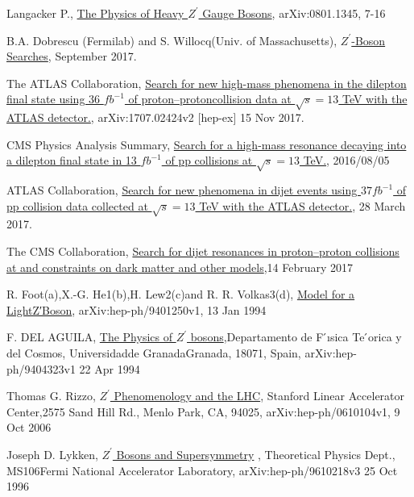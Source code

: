 \documentclass[12pt,a4paper]{article}		%
\begin{document}
\newpage
\begin{thebibliography}{}
	 Langacker P., \href{https://arxiv.org/abs/0801.1345v3}{The Physics of Heavy $Z^\prime$ Gauge Bosons}, arXiv:0801.1345, 7-16
	
	  B.A. Dobrescu (Fermilab) and S. Willocq(Univ. of Massachusetts), \href{http://pdg.lbl.gov/2017/reviews/rpp2017-rev-zprime-searches.pdf}{$Z^\prime$-Boson Searches}, September 2017.
	
	 The ATLAS Collaboration, \href{https://arxiv.org/pdf/1707.02424.pdf}{Search for new high-mass phenomena in the dilepton final state using 36 $fb^{−1}$ of proton–protoncollision data at $\sqrt{s}=13$ TeV with the ATLAS detector.}, arXiv:1707.02424v2  [hep-ex]  15 Nov 2017.
	
	 CMS Physics Analysis Summary, \href{http://inspirehep.net/record/1479666/files/EXO-16-031-pas.pdf?version=1}{Search for a high-mass resonance decaying into a dilepton final state in 13 $fb^{−1}$ of pp collisions at $\sqrt{s}=13$ TeV.}, 2016/08/05
	  
	 ATLAS Collaboration, \href{https://journals.aps.org/prd/pdf/10.1103/PhysRevD.96.052004 }{Search for new phenomena in dijet events using $37fb^{-1}$ of pp collision data collected at $\sqrt{s}=13$ TeV with the ATLAS detector.}, 28 March 2017.  
	
	 The CMS Collaboration, \href{https://www.sciencedirect.com/science/article/pii/S0370269317301028?via%3Dihub}{Search for dijet resonances in proton–proton collisions at and constraints on dark matter and other models},14 February 2017 
		
	 R. Foot(a),X.-G. He1(b),H. Lew2(c)and R. R. Volkas3(d), \href{https://arxiv.org/pdf/hep-ph/9401250.pdf}{Model for a LightZ′Boson}, arXiv:hep-ph/9401250v1, 13 Jan 1994	
	
	 F. DEL AGUILA,  \href{https://arxiv.org/pdf/hep-ph/9404323.pdf}{The Physics of $Z^\prime$ bosons},Departamento de F ́ısica Te ́orica y del Cosmos, Universidadde GranadaGranada, 18071, Spain, arXiv:hep-ph/9404323v1  22 Apr 1994
	
	 Thomas G. Rizzo, \href{https://arxiv.org/pdf/hep-ph/0610104.pdf}{$Z^\prime$ Phenomenology and the LHC},  Stanford Linear Accelerator Center,2575 Sand Hill Rd., Menlo Park, CA, 94025, arXiv:hep-ph/0610104v1,  9 Oct 2006
	
	 Joseph D. Lykken, \href{https://arxiv.org/pdf/hep-ph/9610218.pdf}{$Z^\prime$ Bosons and Supersymmetry} , Theoretical Physics Dept., MS106Fermi National Accelerator Laboratory, arXiv:hep-ph/9610218v3  25 Oct 1996
	

\end{thebibliography}
\end{document}

